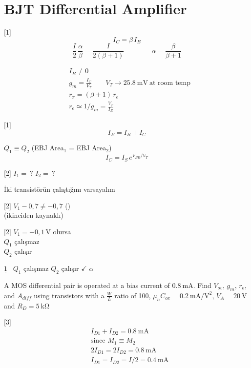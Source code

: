 \documentclass[11pt,a4paper]{article}
\begin{document}

\section{BJT Differential Amplifier}
[1]
\[ I_C = \beta\, I_B \]
\[ \frac{I}{2}\,\frac{\alpha}{\beta} = \frac{I}{2(\beta + 1)} \qquad\qquad \alpha = \frac{\beta}{\beta + 1} \]

\begin{align*}
& I_B \neq 0 \\
& g_m = \frac{I_C}{V_T} \qquad V_T \rightarrow \qty{25,8}{\milli\volt}\ \text{at room temp} \\
& r_\pi = (\beta + 1)\,r_e \\
& r_e \simeq 1/g_m = \frac{V_T}{I_E}
\end{align*}

[1]
\[ I_E = I_B + I_C \]

$Q_1 \equiv Q_2$ \quad (EBJ Area$_1$ = EBJ Area$_2$)
\[ I_C = I_S\, e^{V_{BE}/V_T} \]

[2]
$I_1 = \ ?$ \qquad $I_2 = \ ?$

İki transistörün çalıştığını varsayalım

[2]
$V_1 - 0{,}7 \neq -0{,}7$ \quad () \\
(ikinciden kaynaklı)

[2]
$V_1 = -0{,}1\,\mathrm{V}$ olursa \\
$Q_1$ çalışmaz \\
$Q_2$ çalışır

$\underline{1}$ \ $Q_1$ çalışmaz \qquad $Q_2$ çalışır $\checkmark$ \qquad $\alpha$

\begin{ornek}[4]
A MOS differential pair is operated at a bias current of $\qty{0,8}{\milli\ampere}$. Find $V_{ov}$, $g_m$, $r_o$, and $A_{diff}$ using transistors with a $\frac{W}{L}$ ratio of 100, $\mu_n C_{ox} = \qty{0,2}{\milli\ampere\per\volt\squared}$, $V_A = \qty{20}{\volt}$ and $R_D = \qty{5}{\kilo\ohm}$
\end{ornek}
[3]
\begin{align*}
& I_{D1} + I_{D2} = \qty{0,8}{\milli\ampere} \\
& \text{since } M_1 \equiv M_2 \\
& 2I_{D1} = 2I_{D2} = \qty{0,8}{\milli\ampere} \\
& I_{D1} = I_{D2} = I/2 = \qty{0,4}{\milli\ampere}
\end{align*}
\end{document}
